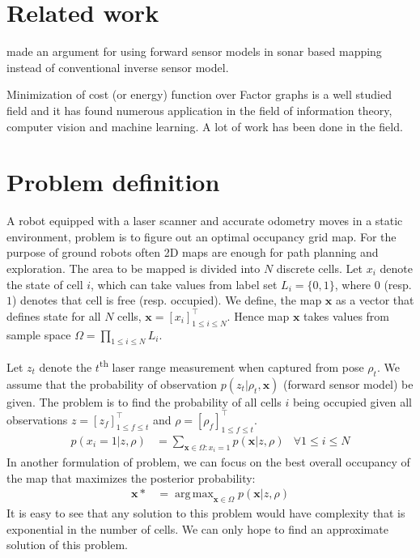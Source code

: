 \documentclass[letterpaper, 10 pt, conference]{ieeeconf} %
\DeclareMathOperator*{\argmax}{arg\,max}
\newcommand{\vect}[1]{\mathbf{#1}}
\begin{document}
\section{Related work}

\cite{thrun2003learning} made an argument for using forward sensor models in sonar based mapping instead of conventional inverse sensor model.


Minimization of cost (or energy) function over Factor graphs is a well studied field and it has found numerous application in the field of information theory, computer vision and machine learning. A lot of work has been done in the field.

\section{Problem definition}
\newcommand{\map}{\vect{x}}
A robot equipped with a laser scanner and accurate odometry moves in a static
environment, problem is to figure out an optimal occupancy grid map. For the
purpose of ground robots often 2D maps are enough for path planning and
exploration.
The area to be mapped is divided into $N$ discrete cells. Let $x_i$ denote the state of cell $i$, which can take values from label set $L_i = \{0, 1\}$, where $0$ (resp. $1$) denotes that cell is free (resp. occupied). We define, the map $\map$ as a vector that defines state for all $N$ cells, $\map = [x_i]^\top_{1 \le i \le N}$. Hence map $\map$ takes values from sample space $\Omega = \prod_{1 \le i \le N}L_i$.

Let $z_t$ denote the $t$\textsuperscript{th} laser range measurement when captured from pose $\rho_t$. We assume that the probability of observation $p(z_t| \rho_t, \map)$ (forward sensor model) be given. The problem is to find the probability of all cells $i$ being occupied given all observations $z = [z_f]^\top_{1 \le f \le t}$ and $\rho = [\rho_f]^\top_{1 \le f \le t}$.
\begin{align}
  p(x_i = 1 | z, \rho) &= \sum_{\map \in \Omega : x_i = 1} p(\map | z , \rho) & \forall 1 \le i \le N 
  \label{eq:fullsolution}
\end{align}
In another formulation of problem, we can focus on the best overall occupancy of the map that maximizes the posterior probability:
\begin{align}
  \vect{x}* &= \argmax_{\map \in \Omega } p(\map | z, \rho)
  \label{eq:mapproblem}
\end{align}
It is easy to see that any solution to this problem would have complexity that is exponential in the number of cells. We can only hope to find an approximate solution of this problem.
\end{document}
